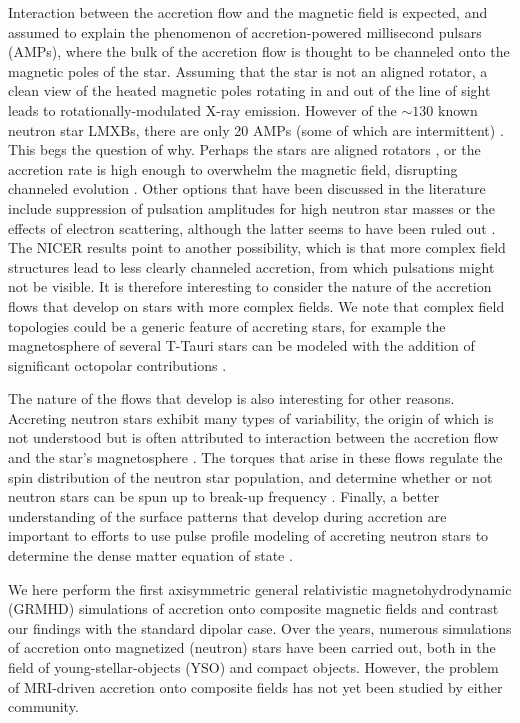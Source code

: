 \documentclass[fleqn,usenatbib]{mnras}
\begin{document}
Interaction between the accretion flow and the magnetic field is expected, and assumed to explain the phenomenon of accretion-powered millisecond pulsars (AMPs), where the bulk of the accretion flow is thought to be channeled onto the magnetic poles of the star.  Assuming that the star is not an aligned rotator, a clean view of the heated magnetic poles rotating in and out of the line of sight leads to rotationally-modulated X-ray emission.  However of the $\sim 130$ known neutron star LMXBs, there are only 20 AMPs (some of which are intermittent) \citep{PatrunoandWatts2012,DiSalvo20}.  This begs the question of why.  Perhaps the stars are aligned rotators \citep{Lamb2009}, or the accretion rate is high enough to overwhelm the magnetic field, disrupting channeled evolution  \citep{Psaltis1999b,Kulkarni2008,RomanovaKulkarni2008}.  Other options that have been discussed in the literature include suppression of pulsation amplitudes for high neutron star masses \citep{Ozel2009} or the effects of electron scattering, although the latter seems to have been ruled out \citep{Gogus2007}. The NICER results point to another possibility, which is that more complex field structures lead to less clearly channeled accretion, from which pulsations might not be visible. It is therefore interesting to consider the nature of the accretion flows that develop on stars with more complex fields.  We note that complex field topologies could be a generic feature of accreting stars, for example the magnetosphere of several  T-Tauri stars can be modeled with the addition of significant octopolar contributions  \citep{Donati2007,Donati2008}.  

 The nature of the flows that develop is also interesting for other reasons.  Accreting neutron stars exhibit many types of variability, the origin of which is not understood but is often attributed to interaction between the accretion flow and the star's magnetosphere \citep{Klis2006}.  The torques that arise in these flows regulate the spin distribution of the neutron star population, and determine whether or not neutron stars can be spun up to break-up frequency \citep[see for example][]{Andersson2005}.  Finally, a better understanding of the surface patterns that develop during accretion are important to efforts to use pulse profile modeling of accreting neutron stars to determine the dense matter equation of state \citep{Watts2016}.

We here perform the first axisymmetric general relativistic magnetohydrodynamic (GRMHD) simulations of accretion onto composite magnetic fields and contrast our findings with the standard dipolar case.  
Over the years, numerous simulations of accretion onto magnetized (neutron) stars have been carried out, both in the field of young-stellar-objects (YSO) and compact objects. However, the problem of MRI-driven accretion onto composite fields has not yet been studied by either community.
\end{document}
